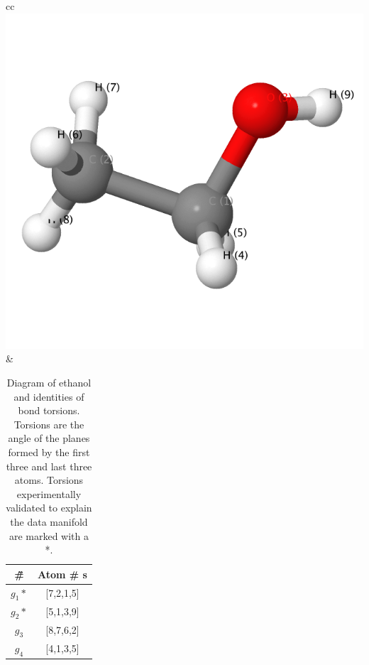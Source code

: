\begin{table}[H]
\begin{tabular}{cc}
\includegraphics[scale=0.25,valign=m]{../Figures/ethanol/ethanol.png}
&
\begin{tabular}{ | c | c | } 
\hline
\G \# & Atom \# s \\
\hline
$g_1*$ & [7,2,1,5]\\
\hline
$g_2*$ & [5,1,3,9] \\
\hline
$g_3$ & [8,7,6,2] \\
\hline
$g_4$ & [4,1,3,5]\\
\hline
\end{tabular}
\end{tabular}
\caption{Diagram of ethanol and identities of bond torsions.  Torsions are the angle of the planes formed by the first three and last three atoms. Torsions experimentally validated to explain the data manifold are marked with a *.}
\label{figtab:eth}
\end{table}


